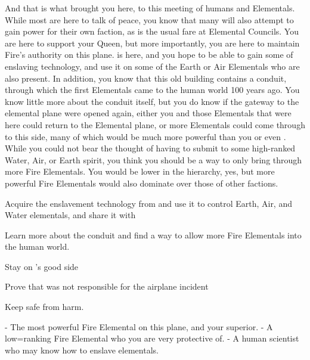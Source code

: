 \documentclass[char]{elementals}
\begin{document}
And that is what brought you here, to this meeting of humans and Elementals.  While most are here to talk of peace, you know that many will also attempt to gain power for their own faction, as is the usual fare at Elemental Councils.  You are here to support your Queen, but more importantly, you are here to maintain Fire's authority on this plane.  \cMS{} is here, and you hope to be able to gain some of  enslaving technology, and use it on some of the Earth or Air Elementals who are also present.  In addition, you know that this old building contains a conduit, through which the first Elementals came to the human world 100 years ago.  You know little more about the conduit itself, but you do know if the gateway to the elemental plane were opened again, either you and those Elementals that were here could return to the Elemental plane, or more Elementals could  come through to this side, many of which would be much more powerful than you or even \cQueen{}.  While you could not bear the thought of having to submit to some high-ranked Water, Air, or Earth spirit, you think you should be a way to only bring through more Fire Elementals.  You would be lower in the hierarchy, yes, but more powerful Fire Elementals would also dominate over those of other factions.  

\begin{itemz}[Goals]
  \item Acquire the enslavement technology from \cMS{} and use it to control Earth, Air, and Water elementals, and share it with \cQueen{}
  \item Learn more about the conduit and find a way to allow more Fire Elementals into the human world.
  \item Stay on \cQueen{}'s good side
  \item Prove that \cJuliet{} was not responsible for the airplane incident 
  \item Keep \cJuliet{} safe from harm.
\end{itemz}

\begin{contacts}
  \contact{\cQueen{}}- The most powerful Fire Elemental on this plane, and your superior.
  \contact{\cJuliet{}}- A low=ranking Fire Elemental who you are very protective of.
  \contact{\cMS{}}- A human scientist who may know how to enslave elementals.
\end{contacts}
\end{document}
